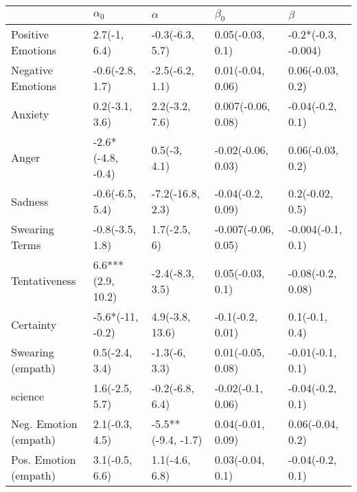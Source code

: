 \begin{tabular}{lllll}
\toprule
{} &         $\alpha_0$ &            $\alpha$ &            $\beta_0$ &              $\beta$ \\
\midrule
Positive Emotions     &       2.7(-1, 6.4) &     -0.3(-6.3, 5.7) &     0.05(-0.03, 0.1) &  -0.2*(-0.3, -0.004) \\
Negative Emotions     &    -0.6(-2.8, 1.7) &     -2.5(-6.2, 1.1) &    0.01(-0.04, 0.06) &     0.06(-0.03, 0.2) \\
Anxiety               &     0.2(-3.1, 3.6) &      2.2(-3.2, 7.6) &   0.007(-0.06, 0.08) &     -0.04(-0.2, 0.1) \\
Anger                 &  -2.6*(-4.8, -0.4) &        0.5(-3, 4.1) &   -0.02(-0.06, 0.03) &     0.06(-0.03, 0.2) \\
Sadness               &    -0.6(-6.5, 5.4) &    -7.2(-16.8, 2.3) &    -0.04(-0.2, 0.09) &      0.2(-0.02, 0.5) \\
Swearing Terms        &    -0.8(-3.5, 1.8) &        1.7(-2.5, 6) &  -0.007(-0.06, 0.05) &    -0.004(-0.1, 0.1) \\
Tentativeness         &  6.6***(2.9, 10.2) &     -2.4(-8.3, 3.5) &     0.05(-0.03, 0.1) &    -0.08(-0.2, 0.08) \\
Certainty             &   -5.6*(-11, -0.2) &     4.9(-3.8, 13.6) &     -0.1(-0.2, 0.01) &       0.1(-0.1, 0.4) \\
Swearing (empath)     &     0.5(-2.4, 3.4) &       -1.3(-6, 3.3) &    0.01(-0.05, 0.08) &     -0.01(-0.1, 0.1) \\
science               &     1.6(-2.5, 5.7) &     -0.2(-6.8, 6.4) &    -0.02(-0.1, 0.06) &     -0.04(-0.2, 0.1) \\
Neg. Emotion (empath) &     2.1(-0.3, 4.5) &  -5.5**(-9.4, -1.7) &    0.04(-0.01, 0.09) &     0.06(-0.04, 0.2) \\
Pos. Emotion (empath) &     3.1(-0.5, 6.6) &      1.1(-4.6, 6.8) &     0.03(-0.04, 0.1) &     -0.04(-0.2, 0.1) \\
\bottomrule
\end{tabular}
